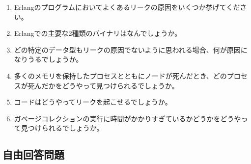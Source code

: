 \begin{enumerate}
  \item Erlangのプログラムにおいてよくあるリークの原因をいくつか挙げてください。
  \item Erlangでの主要な2種類のバイナリはなんでしょうか。
  \item どの特定のデータ型もリークの原因でないように思われる場合、何が原因になりうるでしょうか。
  \item 多くのメモリを保持したプロセスとともにノードが死んだとき、どのプロセスが死んだかをどうやって見つけられるでしょうか。
  \item コードはどうやってリークを起こせるでしょうか。
  \item ガベージコレクションの実行に時間がかかりすぎているかどうかをどうやって見つけられるでしょうか。
\end{enumerate}

\subsection*{自由回答問題}

